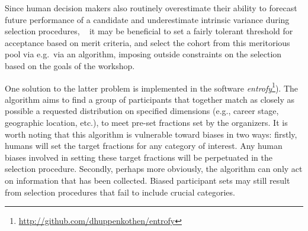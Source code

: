 \documentclass{aastex62}
\begin{document}
Since human decision makers also routinely overestimate their ability to forecast future performance of a candidate and underestimate intrinsic variance during selection procedures, ~\cite{highhouse2008} it may be beneficial to set a fairly tolerant threshold for acceptance based on merit criteria, and select the cohort from this meritorious pool via e.g.\ via an algorithm, imposing outside constraints on the selection based on the goals of the workshop. 

One solution to the latter problem is implemented in the software \textit{entrofy}\footnote{\url{http://github.com/dhuppenkothen/entrofy}}). 
The algorithm aims to find a group of participants that together match as closely as possible a requested distribution on specified dimensions (e.g., career stage, geographic location, etc.), to meet pre-set fractions set by the organizers.
It is worth noting that this algorithm is vulnerable toward biases in two ways: firstly, humans will set the target fractions for any category of interest.  
Any human biases involved in setting these target fractions will be perpetuated in the selection procedure. 
Secondly, perhaps more obviously, the algorithm can only act on information that has been collected.
Biased participant sets may still result from selection procedures that fail to include crucial categories. 
\end{document}
